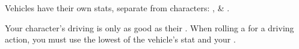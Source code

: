
Vehicles have their own stats, separate from characters: ,  \& .

Your character's driving is only as good as their . When rolling a for a driving action, you must use the lowest of the vehicle's stat and your .
